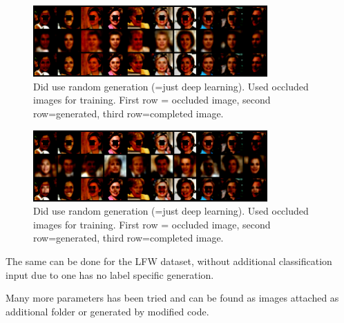 \documentclass[
     11pt,         %
     a4paper,      %
     oneside,
     ]{article}
\begin{document}
\begin{figure}[H]
  \begin{center}
    \includegraphics[width=0.8\textwidth]{presentation_results/VAE/LFW-VAE-useRandom_false-useOccludedForTrain_True.png}
    \caption{Did use random generation (=just deep learning). Used occluded images for training.  First row = occluded image, second row=generated, third row=completed image.}
  \end{center}
\end{figure}
\begin{figure}[H]
  \begin{center}
    \includegraphics[width=0.8\textwidth]{presentation_results/VAE/LFW-VAE-useRandom_True-useOccludedForTrain_False.png}
    \caption{Did use random generation (=just deep learning). Used occluded images for training.  First row = occluded image, second row=generated, third row=completed image.}
  \end{center}
\end{figure}
The same can be done for the LFW dataset, without additional classification input due to one has no label specific generation.


 Many more parameters has been tried and can be found as images attached as additional folder or generated by modified code.
\end{document}
